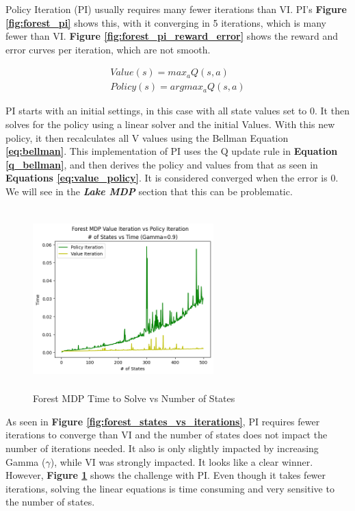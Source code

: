 \documentclass[letterpaper]{article} %
\begin{document}
Policy Iteration (PI) usually requires many fewer iterations than VI.  PI's \textbf{Figure \ref{fig:forest_pi}} shows this, with it converging in 5 iterations, which is many fewer than VI.   \textbf{Figure \ref{fig:forest_pi_reward_error}} shows the reward and error curves per iteration, which are not smooth.  

\begin{equation} \label{eq:value_policy}
\begin{gathered}
Value(s) = max_a Q(s,a)\\
Policy(s) = argmax_a Q(s,a)
\end{gathered}
\end{equation}

PI starts with an initial settings, in this case with all state values set to 0.  It then solves for the policy using a linear solver and the initial Values.  With this new policy, it then recalculates all V values using the Bellman Equation \textbf{\ref{eq:bellman}}.  This implementation of PI uses the Q update rule in \textbf{Equation \ref{q_bellman}}, and then derives the policy and values from that as seen in  \textbf{Equations \ref{eq:value_policy}}.  It is considered converged when the error is 0.  We will see in the \textbf{\emph{Lake MDP}} section that this can be problematic.

\begin{figure}[!htb]
\centering
\includegraphics[width=2.75in, height=2.75in]{Figures/Forest_MDP_Value_Iteration_vs_Policy_Iteration_num_of_States_vs_Time_Gamma_0_9.png}
\caption{Forest MDP Time to Solve vs Number of States}
\label{fig:forest_vi_pi_time}
\end{figure}

As seen in \textbf{Figure \ref{fig:forest_states_vs_iterations}}, PI requires fewer iterations to converge than VI and the number of states does not impact the number of iterations needed.  It also is only slightly impacted by increasing Gamma ($\gamma$), while VI was strongly impacted.  It looks like a clear winner.  However,  \textbf{Figure \ref{fig:forest_vi_pi_time}} shows the challenge with PI.  Even though it takes fewer iterations, solving the linear equations is time consuming and very sensitive to the number of states.
\end{document}
